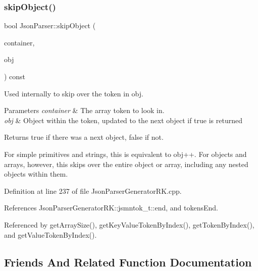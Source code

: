 \subsubsection{\texorpdfstring{skip\+Object()}{skipObject()}}
{\footnotesize\ttfamily bool Json\+Parser\+::skip\+Object (\begin{DoxyParamCaption}\item[{const \hyperlink{struct_json_parser_generator_r_k_1_1jsmntok__t}{Json\+Parser\+Generator\+R\+K\+::jsmntok\+\_\+t} $\ast$}]{container,  }\item[{const \hyperlink{struct_json_parser_generator_r_k_1_1jsmntok__t}{Json\+Parser\+Generator\+R\+K\+::jsmntok\+\_\+t} $\ast$\&}]{obj }\end{DoxyParamCaption}) const}



Used internally to skip over the token in obj. 


\begin{DoxyParams}{Parameters}
{\em container} & The array token to look in.\\
\hline
{\em obj} & Object within the token, updated to the next object if true is returned\\
\hline
\end{DoxyParams}
\begin{DoxyReturn}{Returns}
true if there was a next object, false if not.
\end{DoxyReturn}
For simple primitives and strings, this is equivalent to obj++. For objects and arrays, however, this skips over the entire object or array, including any nested objects within them. 

Definition at line 237 of file Json\+Parser\+Generator\+R\+K.\+cpp.



References Json\+Parser\+Generator\+R\+K\+::jsmntok\+\_\+t\+::end, and tokens\+End.



Referenced by get\+Array\+Size(), get\+Key\+Value\+Token\+By\+Index(), get\+Token\+By\+Index(), and get\+Value\+Token\+By\+Index().



\subsection{Friends And Related Function Documentation}
\mbox{\label{class_json_parser_a26df0cdb3650a4a46921ba1793ecfd03}} 
